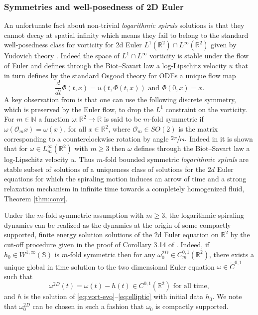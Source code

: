 \documentclass[10pt]{amsart}
\theoremstyle{plain}
\theoremstyle{definition}
\begin{document}
\subsubsection*{Symmetries and well-posedness of 2D Euler}
An unfortunate fact about non-trivial \textit{logarithmic spirals} solutions is that they cannot decay at spatial infinity which means they fail to belong to the standard well-posedness class for vorticity for 2d Euler $L^1(\mathbb{R}^2)\cap L^\infty(\mathbb{R}^2)$ given by Yudovich theory \cite{Y1}. Indeed the space of $L^1\cap L^\infty$ vorticity is stable under the flow of Euler and defines through the Biot--Savart law a log-Lipschitz velocity $u$ that in turn defines by the standard Osgood theory for ODEs a unique flow map
\[
\frac{d}{dt}\Phi(t,x)=u\left(t,\Phi(t,x)\right) \text{ and } \Phi(0,x)=x.
\]
A key observation from \cite{EJ1} is that one can use the following discrete symmetry, which is preserved by the Euler flow, to drop the $L^1$ constraint on the vorticity. For $m\in\mathbb{N}$ a function
$\omega:\mathbb{R}^2\to\mathbb{R}$ is said to be $m$-fold symmetric if $\omega(\mathcal{O}_{m}x)=\omega(x)$, for all $x\in\mathbb{R}^2$, where $\mathcal{O}_m\in SO(2)$ is the matrix corresponding to a counterclockwise rotation by angle $\sfrac{2\pi}{m}.$ Indeed in \cite{EJ1} it is shown that for $\omega \in L^\infty_m(\mathbb{R}^2)$ with $m\geq 3$ then $\omega$ defines through the Biot--Savart law a log-Lipschitz velocity $u$. Thus $m$-fold bounded symmetric \textit{logarithmic spirals} are stable subset of solutions of a uniqueness class of solutions for the $2d$ Euler equations for which the spiraling motion induces an arrow of time and a strong relaxation mechanism in infinite time towards a completely homogenized fluid, Theorem \ref{thm:conv}.

Under the $m$-fold symmetric assumption with $m\ge 3$, the logarithmic spiraling dynamics can be realized as the dynamics at the origin of some compactly supported, finite energy solution solutions of the 2d Euler equation on $\mathbb{R}^2$ by the cut-off procedure given in the proof of Corollary 3.14 of \cite{EJ1}. Indeed, if $h_0\in W^{1,\infty}(\mathbb{S})$ is $m$-fold symmetric then for any $\omega^{2D}_0\in C^{0,1}_m\left(\mathbb{R}^2\right)$, there exists a unique global in time solution to the two dimensional Euler equation $\omega\in \mathring{C}^{0,1}$ such that
\[
\omega^{2D}(t)=\omega(t)-h(t)\in C^{0,1}\left(\mathbb{R}^2\right) \text{ for all time},
\]
and $h$ is the solution of \eqref{eq:vort-evo}--\eqref{eq:elliptic} with initial data $h_0$. We note that $\omega^{2D}_0$ can be chosen in such a fashion that $\omega_0$ is compactly supported.
\end{document}
